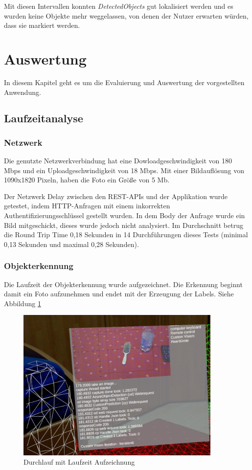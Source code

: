 Mit diesen Intervallen konnten \textit{DetectedObjects} gut lokalisiert werden und es wurden keine Objekte mehr weggelassen, von denen der Nutzer erwarten würden, dass sie markiert werden.

\newpage
\section{Auswertung}

In diesem Kapitel geht es um die Evaluierung und Auswertung der vorgestellten Anwendung.

\subsection{Laufzeitanalyse}

\subsubsection{Netzwerk}

Die genutzte Netzwerkverbindung hat eine Dowloadgeschwindigkeit von 180 Mbps und ein Uploadgeschwindigkeit von 18 Mbps. Mit einer Bildauflösung von 1090x1820 Pixeln, haben die Foto ein Größe von 5 Mb. 

Der Netzwerk Delay zwischen den REST-APIs und der Applikation wurde getestet, indem HTTP-Anfragen mit einem inkorrekten Authentifizierungsschlüssel gestellt wurden. In dem Body der Anfrage wurde ein Bild mitgeschickt, dieses wurde jedoch nicht analysiert. Im Durchschnitt betrug die Round Trip Time 0,18 Sekunden in 14 Durchführungen dieses Tests (minimal 0,13 Sekunden und maximal 0,28 Sekunden).


\subsubsection{Objekterkennung}
Die Laufzeit der Objekterkennung wurde aufgezeichnet. Die Erkennung beginnt damit ein Foto aufzunehmen und endet mit der Erzeugung der Labels.
Siehe Abbildung \ref{img:laufzeit}

\begin{figure}[H]
	\centering
	\includegraphics[width=0.9\textwidth]{images/ML_20201014_02.30.11.jpg}
	\caption[Laufzeit einer Objekterkennung]{Durchlauf mit Laufzeit Aufzeichnung}
	\label{img:laufzeit}
\end{figure}

